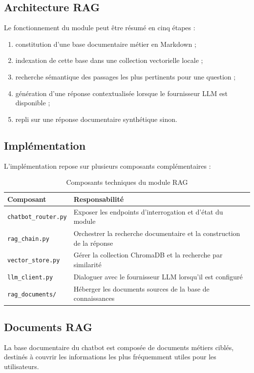 \subsection{Architecture RAG}
Le fonctionnement du module peut être résumé en cinq étapes :
\begin{enumerate}
    \item constitution d'une base documentaire métier en Markdown ;
    \item indexation de cette base dans une collection vectorielle locale ;
    \item recherche sémantique des passages les plus pertinents pour une question ;
    \item génération d'une réponse contextualisée lorsque le fournisseur LLM est disponible ;
    \item repli sur une réponse documentaire synthétique sinon.
\end{enumerate}

\subsection{Implémentation}
L'implémentation repose sur plusieurs composants complémentaires :

\begin{table}[H]
\centering
\caption{Composants techniques du module RAG}
\label{tab:rag_components}
\begin{tabularx}{\textwidth}{|l|X|}
\hline
\textbf{Composant} & \textbf{Responsabilité} \\
\hline
\texttt{chatbot\_router.py} & Exposer les endpoints d'interrogation et d'état du module \\
\hline
\texttt{rag\_chain.py} & Orchestrer la recherche documentaire et la construction de la réponse \\
\hline
\texttt{vector\_store.py} & Gérer la collection ChromaDB et la recherche par similarité \\
\hline
\texttt{llm\_client.py} & Dialoguer avec le fournisseur LLM lorsqu'il est configuré \\
\hline
\texttt{rag\_documents/} & Héberger les documents sources de la base de connaissances \\
\hline
\end{tabularx}
\end{table}

\subsection{Documents RAG}
La base documentaire du chatbot est composée de documents métiers ciblés, destinés à couvrir les informations les plus fréquemment utiles pour les utilisateurs.


